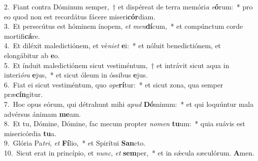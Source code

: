 {2.~}Fiant contra Dóminum semper,~† et dispéreat de terra memóri\textit{a} \textit{e}\textbf{ó}rum:~* pro eo quod non est recordátus fácere miseri\textbf{cór}diam.\\
{3.~}Et persecútus est hóminem ínopem, \textit{et} \textit{men}\textbf{dí}cum,~* et compúnctum corde mortifi\textbf{cá}re.\\
{4.~}Et diléxit maledictiónem, et vé\textit{ni}\textit{et} \textbf{e}i:~* et nóluit benedictiónem, et elongábitur ab \textbf{e}o.\\
{5.~}Et índuit maledictiónem sicut vestiméntum,~† et intrávit sicut aqua in interi\textit{ó}\textit{ra} \textbf{e}jus,~* et sicut óleum in óssibus \textbf{e}jus.\\
{6.~}Fiat ei sicut vestiméntum, quo \textit{o}\textit{pe}\textbf{rí}tur:~* et sicut zona, qua semper præ\textbf{cín}gitur.\\
{7.~}Hoc opus eórum, qui détrahunt mihi \textit{a}\textit{pud} \textbf{Dó}minum:~* et qui loquúntur mala advérsus ánimam \textbf{me}am.\\
{8.~}Et tu, Dómine, Dómine, fac mecum propter \textit{no}\textit{men} \textbf{tu}um:~* quia suávis est misericórdia \textbf{tu}a.\\
{9.~}Glória Pa\textit{tri}, \textit{et} \textbf{Fí}lio,~* et Spirítui \textbf{San}cto.\\
{10.~}Sicut erat in princípio, et \textit{nunc}, \textit{et} \textbf{sem}per,~* et in sǽcula sæculórum. \textbf{A}men.\\

